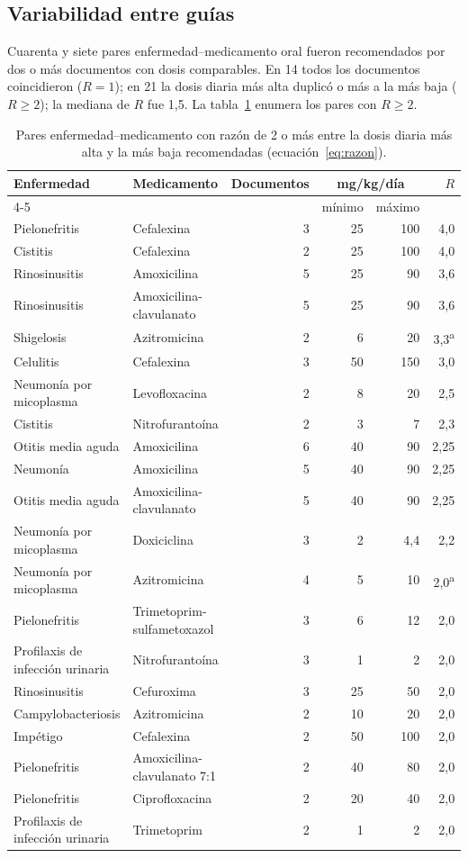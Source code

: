 \documentclass[11pt,a4paper]{article}
\begin{document}
\subsection{Variabilidad entre guías}

Cuarenta y siete pares enfermedad--medicamento oral fueron recomendados por dos o más documentos con dosis comparables. En 14 todos los documentos coincidieron ($R = 1$); en 21 la dosis diaria más alta duplicó o más a la más baja ($R \ge 2$); la mediana de $R$ fue 1,5. La tabla~\ref{tab:discordancia} enumera los pares con $R \ge 2$.

\begin{table}[htbp]
\centering
\caption{Pares enfermedad--medicamento con razón de 2 o más entre la dosis diaria más alta y la más baja recomendadas (ecuación~\ref{eq:razon}).}
\label{tab:discordancia}
\small
\begin{tabular}{@{}llrrrr@{}}
\toprule
Enfermedad & Medicamento & Documentos & \multicolumn{2}{c}{mg/kg/día} & $R$ \\
\cmidrule(lr){4-5}
& & & mínimo & máximo & \\
\midrule
Pielonefritis & Cefalexina & 3 & 25 & 100 & 4,0 \\
Cistitis & Cefalexina & 2 & 25 & 100 & 4,0 \\
Rinosinusitis & Amoxicilina & 5 & 25 & 90 & 3,6 \\
Rinosinusitis & Amoxicilina-clavulanato & 5 & 25 & 90 & 3,6 \\
Shigelosis & Azitromicina & 2 & 6 & 20 & 3,3\textsuperscript{a} \\
Celulitis & Cefalexina & 3 & 50 & 150 & 3,0 \\
Neumonía por micoplasma & Levofloxacina & 2 & 8 & 20 & 2,5 \\
Cistitis & Nitrofurantoína & 2 & 3 & 7 & 2,3 \\
Otitis media aguda & Amoxicilina & 6 & 40 & 90 & 2,25 \\
Neumonía & Amoxicilina & 5 & 40 & 90 & 2,25 \\
Otitis media aguda & Amoxicilina-clavulanato & 5 & 40 & 90 & 2,25 \\
Neumonía por micoplasma & Doxiciclina & 3 & 2 & 4,4 & 2,2 \\
Neumonía por micoplasma & Azitromicina & 4 & 5 & 10 & 2,0\textsuperscript{a} \\
Pielonefritis & Trimetoprim-sulfametoxazol & 3 & 6 & 12 & 2,0 \\
Profilaxis de infección urinaria & Nitrofurantoína & 3 & 1 & 2 & 2,0 \\
Rinosinusitis & Cefuroxima & 3 & 25 & 50 & 2,0 \\
Campylobacteriosis & Azitromicina & 2 & 10 & 20 & 2,0 \\
Impétigo & Cefalexina & 2 & 50 & 100 & 2,0 \\
Pielonefritis & Amoxicilina-clavulanato 7:1 & 2 & 40 & 80 & 2,0 \\
Pielonefritis & Ciprofloxacina & 2 & 20 & 40 & 2,0 \\
Profilaxis de infección urinaria & Trimetoprim & 2 & 1 & 2 & 2,0 \\
\bottomrule
\end{tabular}


\end{table}
\end{document}
